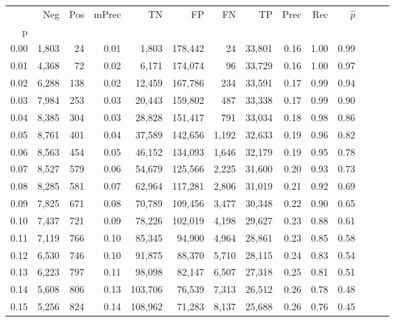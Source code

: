\begin{tabular}{rrrrrrrrrrrrrr}
\toprule
{} &    Neg &  Pos & mPrec &       TN &       FP &      FN &      TP &  Prec &   Rec & $\hat{p}$ \\
p    &        &      &       &          &          &         &         &       &       &           \\
\midrule
0.00 &  1,803 &   24 &  0.01 &    1,803 &  178,442 &      24 &  33,801 &  0.16 &  1.00 &      0.99 \\
0.01 &  4,368 &   72 &  0.02 &    6,171 &  174,074 &      96 &  33,729 &  0.16 &  1.00 &      0.97 \\
0.02 &  6,288 &  138 &  0.02 &   12,459 &  167,786 &     234 &  33,591 &  0.17 &  0.99 &      0.94 \\
0.03 &  7,984 &  253 &  0.03 &   20,443 &  159,802 &     487 &  33,338 &  0.17 &  0.99 &      0.90 \\
0.04 &  8,385 &  304 &  0.03 &   28,828 &  151,417 &     791 &  33,034 &  0.18 &  0.98 &      0.86 \\
0.05 &  8,761 &  401 &  0.04 &   37,589 &  142,656 &   1,192 &  32,633 &  0.19 &  0.96 &      0.82 \\
0.06 &  8,563 &  454 &  0.05 &   46,152 &  134,093 &   1,646 &  32,179 &  0.19 &  0.95 &      0.78 \\
0.07 &  8,527 &  579 &  0.06 &   54,679 &  125,566 &   2,225 &  31,600 &  0.20 &  0.93 &      0.73 \\
0.08 &  8,285 &  581 &  0.07 &   62,964 &  117,281 &   2,806 &  31,019 &  0.21 &  0.92 &      0.69 \\
0.09 &  7,825 &  671 &  0.08 &   70,789 &  109,456 &   3,477 &  30,348 &  0.22 &  0.90 &      0.65 \\
0.10 &  7,437 &  721 &  0.09 &   78,226 &  102,019 &   4,198 &  29,627 &  0.23 &  0.88 &      0.61 \\
0.11 &  7,119 &  766 &  0.10 &   85,345 &   94,900 &   4,964 &  28,861 &  0.23 &  0.85 &      0.58 \\
0.12 &  6,530 &  746 &  0.10 &   91,875 &   88,370 &   5,710 &  28,115 &  0.24 &  0.83 &      0.54 \\
0.13 &  6,223 &  797 &  0.11 &   98,098 &   82,147 &   6,507 &  27,318 &  0.25 &  0.81 &      0.51 \\
0.14 &  5,608 &  806 &  0.13 &  103,706 &   76,539 &   7,313 &  26,512 &  0.26 &  0.78 &      0.48 \\
0.15 &  5,256 &  824 &  0.14 &  108,962 &   71,283 &   8,137 &  25,688 &  0.26 &  0.76 &      0.45 \\

\end{tabular}
